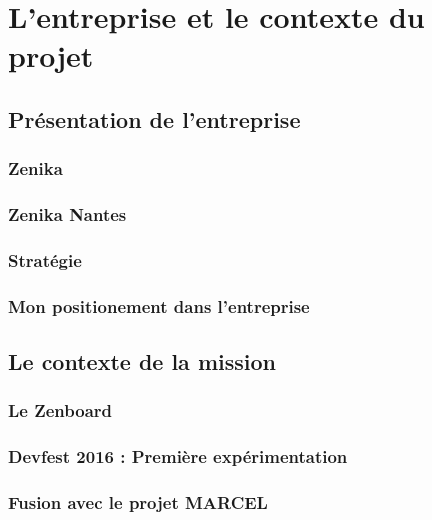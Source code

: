 \documentclass[twoside, 12pt]{report}
\begin{document}
\part{L'entreprise et le contexte du projet}

    \chapter{Présentation de l'entreprise}
        

        \section{Zenika}
            

        \section{Zenika Nantes}
            

        \section{Stratégie}
            

        \section{Mon positionement dans l'entreprise}
        	

    \chapter{Le contexte de la mission}
        

        \section{Le Zenboard}
        	

        \section{Devfest 2016 : Première expérimentation }
            

        \section{Fusion avec le projet MARCEL}
            
\end{document}
